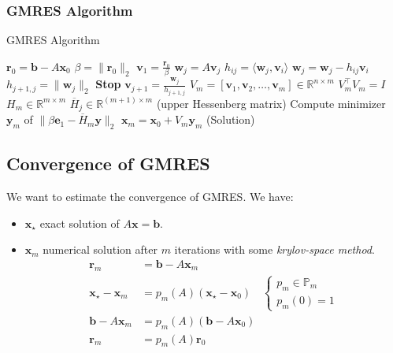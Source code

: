 \subsubsection{GMRES Algorithm}
\begin{algorithm}[H]
    \caption{GMRES Algorithm}
    \begin{algorithmic}
        \State $\mathbf{r}_0 = \mathbf{b} - A\mathbf{x}_0$
        \State $\beta = \|\mathbf{r}_0\|_2$
        \State $\mathbf{v}_1 = \frac{\mathbf{r}_0}{\beta}$
        \State $\mathbf{w}_j = A\mathbf{v}_j$
        \State $h_{ij} = \langle \mathbf{w}_j, \mathbf{v}_i \rangle$
        \State $\mathbf{w}_j = \mathbf{w}_j - h_{ij} \mathbf{v}_i$
        \EndFor
        \State $h_{j+1,j} = \|\mathbf{w}_j\|_2$
         \textbf{Stop}
        \EndIf
        \State $\mathbf{v}_{j+1} = \frac{\mathbf{w}_j}{h_{j+1,j}}$
        \EndFor
        \State $V_m = [\mathbf{v}_1, \mathbf{v}_2, \ldots, \mathbf{v}_m] \in \mathbb{R}^{n \times m}$
        \State $V_m^\top V_m = I$
        \State $H_m \in \mathbb{R}^{m \times m}$
        \State $\overline{H}_j \in \mathbb{R}^{(m+1) \times m}$ (upper Hessenberg matrix)
        \State Compute minimizer $\mathbf{y}_m$ of $\|\beta \mathbf{e}_1 - \overline{H}_m \mathbf{y}\|_2$
        \State $\mathbf{x}_m = \mathbf{x}_0 + V_m \mathbf{y}_m$ (Solution)
    \end{algorithmic}
\end{algorithm}

\subsection{Convergence of GMRES}
We want to estimate the convergence of GMRES. We have:
\begin{itemize}
    \item $\mathbf{x}_\star$ exact solution of $A\mathbf{x} = \mathbf{b}$.
    \item $\mathbf{x}_m$ numerical solution after $m$ iterations with some \emph{krylov-space method}.
          \begin{align*}
              \mathbf{r}_m &= \mathbf{b} - A\mathbf{x}_m \tag{residual error} \\
              \mathbf{x}_\star - \mathbf{x}_m & = p_m(A)(\mathbf{x}_\star - \mathbf{x}_0)
              \quad
              \begin{cases}
                p_m \in \mathbb{P}_m\\
                p_m(0) = 1
                \end{cases} \\
              \mathbf{b} - A\mathbf{x}_m      & = p_m(A)(\mathbf{b} - A\mathbf{x}_0)                                                  \\
              \mathbf{r}_m                    & = p_m(A)\mathbf{r}_0
          \end{align*}
\end{itemize}

